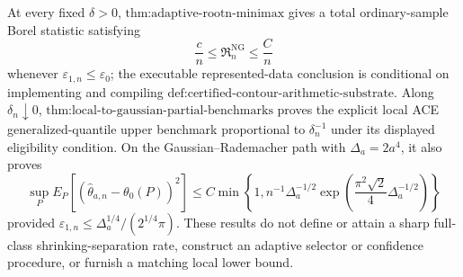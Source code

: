 At every fixed \(\delta>0\), \(\text{thm:adaptive-rootn-minimax}\) gives a total ordinary-sample Borel statistic satisfying
\[
 \frac{c}{n}\le \mathfrak R_n^{\mathrm{NG}}\le \frac{C}{n}
\]
whenever \(\varepsilon_{1,n}\le\varepsilon_0\); the executable represented-data conclusion is conditional on implementing and compiling \(\text{def:certified-contour-arithmetic-substrate}\). Along \(\delta_n\downarrow0\), \(\text{thm:local-to-gaussian-partial-benchmarks}\) proves the explicit local ACE generalized-quantile upper benchmark proportional to \(\delta_n^{-1}\) under its displayed eligibility condition. On the Gaussian--Rademacher path with \(\Delta_a=2a^4\), it also proves
\[
 \sup_P E_P\!\left[(\widehat\theta_{a,n}-\theta_0(P))^2\right]
 \le C\min\!\left\{1,
 n^{-1}\Delta_a^{-1/2}
 \exp\!\left(\frac{\pi^2\sqrt2}{4}\Delta_a^{-1/2}\right)
 \right\}
\]
provided \(\varepsilon_{1,n}\le\Delta_a^{1/4}/(2^{1/4}\pi)\). These results do not define or attain a sharp full-class shrinking-separation rate, construct an adaptive selector or confidence procedure, or furnish a matching local lower bound.